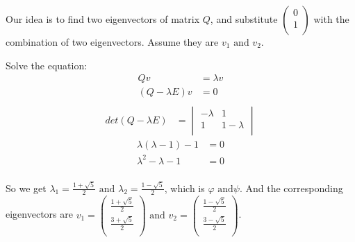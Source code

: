 \documentclass[utf-8]{article}
\begin{document}
Our idea is to find two eigenvectors of matrix $Q$, and substitute $
\begin{pmatrix}
  0 \\
  1 \\
\end{pmatrix}
$ with the combination of two eigenvectors. Assume they are $v_1
\mbox{ and } v_2$.

Solve the equation:
\begin{equation}
  \label{eq:1}
  \begin{aligned}
    Qv &=\lambda v \\
    (Q-\lambda E)v &= 0 \\
  \end{aligned}
\end{equation}
\begin{equation}
  \label{eq:2}
  \begin{aligned}
    det(Q-\lambda E) &=
    \begin{vmatrix}
      -\lambda & 1 \\
      1 & 1-\lambda \\
    \end{vmatrix}
  \end{aligned}
\end{equation}
\begin{align*}
  \lambda(\lambda -1)-1&=0 \\
  \lambda^2-\lambda-1 &=0 \\
\end{align*}

So we get $\lambda_1=\frac{1+\sqrt{5}}{2} \mbox{ and }
\lambda_2=\frac{1-\sqrt{5}}{2}$, which is $\varphi \mbox{ and
}\psi$. And the corresponding eigenvectors are $v_1=
\begin{pmatrix}
  \frac{1+\sqrt{5}}{2} \\
  \frac{3+\sqrt{5}}{2} \\
\end{pmatrix} \mbox{ and } v_2=
\begin{pmatrix}
  \frac{1-\sqrt{5}}{2} \\
  \frac{3-\sqrt{5}}{2} \\
\end{pmatrix}
$.
\end{document}

